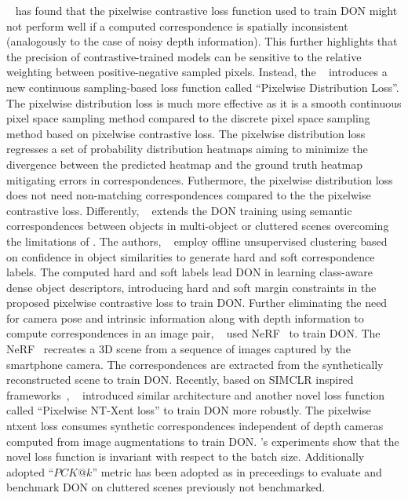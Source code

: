 \citeauthor{florence2020dense}~\cite{florence2020dense} has found that the pixelwise contrastive loss function used to train DON might not perform well if a computed
correspondence is spatially inconsistent (analogously to the case of noisy depth information). This further highlights that the precision
of contrastive-trained models can be sensitive to the
relative weighting between positive-negative sampled pixels. Instead, the \citeauthor{florence2020dense}~\cite{florence2020dense} introduces a new continuous
sampling-based loss function called ``Pixelwise Distribution Loss''.
The pixelwise distribution loss is much more effective as it is a smooth continuous pixel space sampling method compared to the
discrete pixel space sampling method based on pixelwise contrastive loss.
The pixelwise distribution loss regresses a set of probability distribution heatmaps aiming to minimize the divergence between the predicted
heatmap and the ground truth heatmap mitigating errors in correspondences. Futhermore, the pixelwise distribution loss does not
need non-matching correspondences compared to the
the pixelwise contrastive loss.
Differently, \citeauthor{hadjivelichkov2021fully}~\cite{hadjivelichkov2021fully} extends the DON training using semantic correspondences between objects in multi-object
or cluttered scenes overcoming the limitations of \parencites{hartley2003multiple}{belkin2003laplacian}.
The authors, \citeauthor{hadjivelichkov2021fully}~\cite{hadjivelichkov2021fully} employ offline unsupervised clustering based on confidence in object similarities to generate hard and soft correspondence labels.
The computed hard and soft labels lead DON in learning class-aware dense object descriptors, introducing hard and soft margin constraints in the proposed pixelwise contrastive loss to train DON.
Further eliminating the need for camera pose and intrinsic information along with depth information to compute correspondences in an image pair, \citeauthor{nerf-Supervision}~\cite{nerf-Supervision} used
NeRF~\cite{mildenhall2021nerf} to train DON. The NeRF~\cite{mildenhall2021nerf} recreates a 3D scene from a sequence of images captured by the smartphone camera. The correspondences are extracted from
the synthetically reconstructed scene to train DON.
Recently, based on SIMCLR inspired frameworks~\parencites{chen2020simple}{zbontar2021barlow},
\citeauthor{adrian2022efficient}~\cite{adrian2022efficient} introduced similar architecture and another novel loss function called
``Pixelwise NT-Xent loss'' to train DON more robustly.
The pixelwise ntxent loss consumes synthetic correspondences independent of depth cameras computed from image augmentations to train DON.
\citeauthor{adrian2022efficient}'s experiments show that the novel loss function is invariant with respect to the batch size.
Additionally adopted ``$PCK@k$''
metric has been adopted as in preceedings \parencites{chai2019multi}{fathy2018hierarchical} to evaluate and benchmark
DON on cluttered scenes previously not benchmarked.

